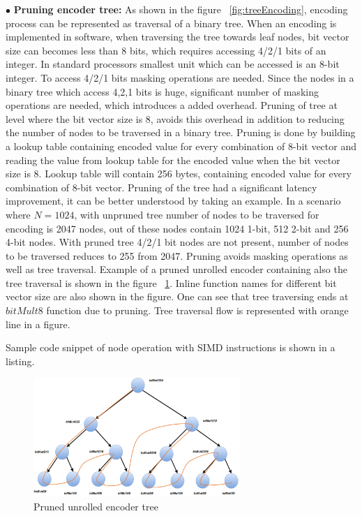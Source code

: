 $\bullet$ \textbf{Pruning encoder tree:} As shown in the figure ~\ref{fig:treeEncoding}, encoding process can be represented as traversal of a binary tree. When an encoding is implemented in software, when traversing the tree towards leaf nodes, bit vector size can becomes less than 8 bits, which requires accessing 4/2/1 bits of an integer. In standard processors smallest unit which can be accessed is an 8-bit integer. To access 4/2/1 bits masking operations are needed. Since the nodes in a binary tree which access 4,2,1 bits is huge, significant number of masking operations are needed, which introduces a added overhead. Pruning of tree at level where the bit vector size is 8, avoids this overhead in addition to reducing the number of nodes to be traversed in a binary tree. Pruning is done by building a lookup table containing encoded value for every combination of 8-bit vector and reading the value from lookup table for the encoded value when the bit vector size is 8. Lookup table will contain 256 bytes, containing encoded value for every combination of 8-bit vector.\newline
\newline
Pruning of the tree had a significant latency improvement, it can be better understood by taking an example. In a scenario where $N = 1024$, with unpruned tree number of nodes to be traversed for encoding is 2047 nodes, out of these nodes contain 1024 1-bit, 512 2-bit and 256 4-bit nodes. With pruned tree 4/2/1 bit nodes are not present, number of nodes to be traversed reduces to 255 from 2047. Pruning avoids masking operations as well as tree traversal. \newline
\newline
Example of a pruned unrolled encoder containing also the tree traversal is shown in the figure ~\ref{fig:unrolledEncoder}. Inline function names for different bit vector size are also shown in the figure. One can see that tree traversing ends at $bitMult8$ function due to pruning. Tree traversal flow is represented with orange line in a figure.

Sample code snippet of node operation with SIMD instructions is shown in a listing.

\begin{figure}[!h]
	\centering
	\includegraphics[width=0.7\textwidth]{./figures/unrolledEncoder.pdf}
	\caption{Pruned unrolled encoder tree}
	\label{fig:unrolledEncoder}
\end{figure}

